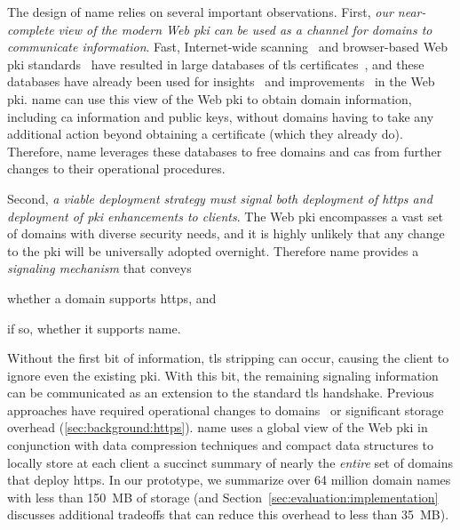 The design of \ac{name} relies on several important observations. First,
\emph{our near-complete view of the modern Web \ac{pki} can be used as a channel
for domains to communicate information}. Fast, Internet-wide
scanning~\cite{durumeric2013zmap} and browser-based Web \ac{pki}
standards~\cite{sleevi2016requiring} have resulted in large databases of
\ac{tls} certificates~\cite{durumeric2015search}, and these databases have
already been used for insights~\cite{vandersloot2016towards} and
improvements~\cite{larisch2017crlite} in the Web \ac{pki}. \ac{name} can use
this view of the Web \ac{pki} to obtain domain information, including \ac{ca}
information and public keys, without domains having to take any additional action
beyond obtaining a certificate (which they already do). Therefore, \ac{name}
leverages these databases to free domains and \acp{ca} from further changes to
their operational procedures.

Second, \emph{a viable deployment strategy must signal both deployment of
\ac{https} and deployment of \ac{pki} enhancements to clients}. The Web \ac{pki}
encompasses a vast set of domains with diverse security needs, and it is highly
unlikely that any change to the \ac{pki} will be universally adopted overnight.
Therefore \ac{name} provides a \emph{signaling mechanism} that conveys
\begin{inparaenum}
\item whether a domain supports \ac{https}, and
\item if so, whether it supports \ac{name}.
\end{inparaenum}
Without the first bit of information, \ac{tls} stripping can occur, causing the
client to ignore even the existing \ac{pki}. With this bit, the remaining
signaling information can be communicated as an extension to the standard
\ac{tls} handshake. Previous approaches have required operational changes to
domains~\cite{rfc4033, rfc6698} or significant storage overhead
(\autoref{sec:background:https}). \ac{name} uses a global view of the Web
\ac{pki} in conjunction with data compression techniques and compact data
structures to locally store at each client a succinct summary of nearly the
\emph{entire} set of domains that deploy \ac{https}. In our prototype, we
summarize over 64 million domain names with less than 150~MB of storage (and
Section~\ref{sec:evaluation:implementation} discusses additional tradeoffs that
can reduce this overhead to less than 35~MB).

